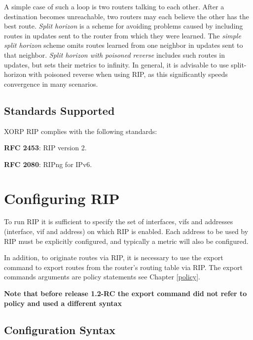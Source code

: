 A simple case of such a loop is two routers talking to each other.
After a destination becomes unreachable, two routers may each believe
the other has the best route.  {\it Split horizon} is a scheme for
avoiding problems caused by including routes in updates sent to the
router from which they were learned.  The {\it simple split horizon}
scheme omits routes learned from one neighbor in updates sent to that
neighbor.  {\it Split horizon with poisoned reverse} includes such
routes in updates, but sets their metrics to infinity.  In general, it
is advisable to use split-horizon with poisoned reverse when using
RIP, as this significantly speeds convergence in many scenarios.

\subsection{Standards Supported}

XORP RIP complies with the following standards:
\begin{description}
\item{\bf RFC 2453}: RIP version 2.
\item{\bf RFC 2080}: RIPng for IPv6.
\end{description} 

\newpage
\section{Configuring RIP}

To run RIP it is sufficient to specify the set of interfaces, vifs and
addresses ({\stt interface}, {\stt vif} and {\stt address}) on which
RIP is enabled.  Each {\stt address} to be used by RIP must be
explicitly configured, and typically a metric will also be configured.

In addition, to originate routes via RIP, it is necessary to use the
{\stt export} command to export routes from the router's routing table
via RIP. The {\stt export} commands arguments are policy statements
see Chapter \ref{policy}.

{\bf Note that before release 1.2-RC the {\stt export} command did not
refer to policy and used a different syntax}

\subsection{Configuration Syntax}

